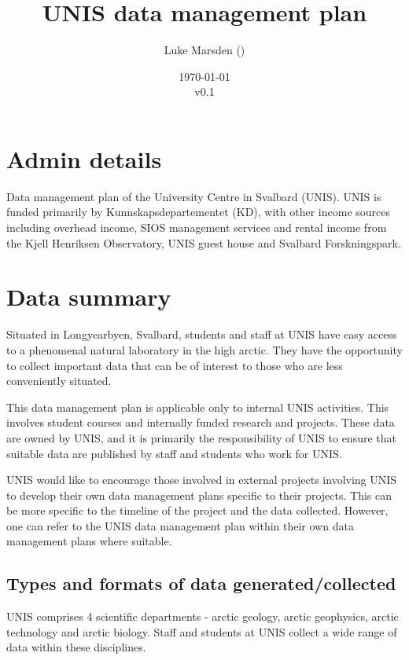\documentclass[a4paper,english, 11pt]{article}
\title{UNIS data management plan}
\date{\today\\v0.1}
\author{Luke Marsden (\emailme)}
\begin{document}
\maketitle
\tableofcontents

\newpage

\section{Admin details}
\label{s:admin}

Data management plan of the University Centre in Svalbard (UNIS). UNIS is funded primarily by Kunnskapsdepartementet (KD), with other income sources including overhead income, SIOS management services and rental income from the Kjell Henriksen Observatory, UNIS guest house and Svalbard Forskningspark.

\section{Data summary}
\label{s:data}

Situated in Longyearbyen, Svalbard, students and staff at UNIS have easy access to a phenomenal natural laboratory in the high arctic. 
They have the opportunity to collect important data that can be of interest to those who are less conveniently situated.

This data management plan is applicable only to internal UNIS activities. This involves student courses and internally funded research and projects. These data are owned by UNIS, and it is primarily the responsibility of UNIS to ensure that suitable data are published by staff and students who work for UNIS. 

UNIS would like to encourage those involved in external projects involving UNIS to develop their own data management plans specific to their projects. This can be more specific to the timeline of the project and the data collected. However, one can refer to the UNIS data management plan within their own data management plans where suitable.

\subsection{Types and formats of data generated/collected}
\label{ss:datatypes}

UNIS comprises 4 scientific departments - arctic geology, arctic geophysics, arctic technology and arctic biology. Staff and students at UNIS collect a wide range of data within these disciplines.
\end{document}
